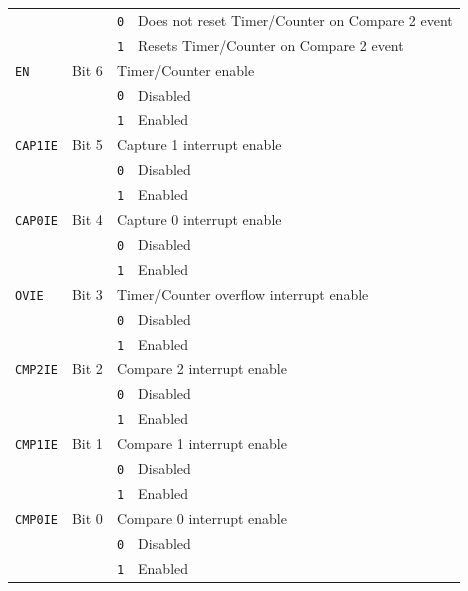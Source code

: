 \begin{tabularx}{\textwidth}{ l l l X }
 & & \texttt{0} & Does not reset Timer/Counter on Compare 2 event \\
 & & \cellcolor{tablehighlightcolor}\texttt{1} & \cellcolor{tablehighlightcolor}Resets Timer/Counter on Compare 2 event \\
\hline
\texttt{EN} & Bit 6 & \multicolumn{2}{X}{Timer/Counter enable} \\
 & & \texttt{0} & Disabled \\
 & & \cellcolor{tablehighlightcolor}\texttt{1} & \cellcolor{tablehighlightcolor}Enabled \\
\hline
\texttt{CAP1IE} & Bit 5 & \multicolumn{2}{X}{Capture 1 interrupt enable} \\
 & & \texttt{0} & Disabled \\
 & & \cellcolor{tablehighlightcolor}\texttt{1} & \cellcolor{tablehighlightcolor}Enabled \\
\hline
\texttt{CAP0IE} & Bit 4 & \multicolumn{2}{X}{Capture 0 interrupt enable} \\
 & & \texttt{0} & Disabled \\
 & & \cellcolor{tablehighlightcolor}\texttt{1} & \cellcolor{tablehighlightcolor}Enabled \\
\hline
\texttt{OVIE} & Bit 3 & \multicolumn{2}{X}{Timer/Counter overflow interrupt enable} \\
 & & \texttt{0} & Disabled \\
 & & \cellcolor{tablehighlightcolor}\texttt{1} & \cellcolor{tablehighlightcolor}Enabled \\
\hline
\texttt{CMP2IE} & Bit 2 & \multicolumn{2}{X}{Compare 2 interrupt enable} \\
 & & \texttt{0} & Disabled \\
 & & \cellcolor{tablehighlightcolor}\texttt{1} & \cellcolor{tablehighlightcolor}Enabled \\
\hline
\texttt{CMP1IE} & Bit 1 & \multicolumn{2}{X}{Compare 1 interrupt enable} \\
 & & \texttt{0} & Disabled \\
 & & \cellcolor{tablehighlightcolor}\texttt{1} & \cellcolor{tablehighlightcolor}Enabled \\
\hline
\texttt{CMP0IE} & Bit 0 & \multicolumn{2}{X}{Compare 0 interrupt enable} \\
 & & \texttt{0} & Disabled \\
 & & \cellcolor{tablehighlightcolor}\texttt{1} & \cellcolor{tablehighlightcolor}Enabled \\
\hline
\end{tabularx}

